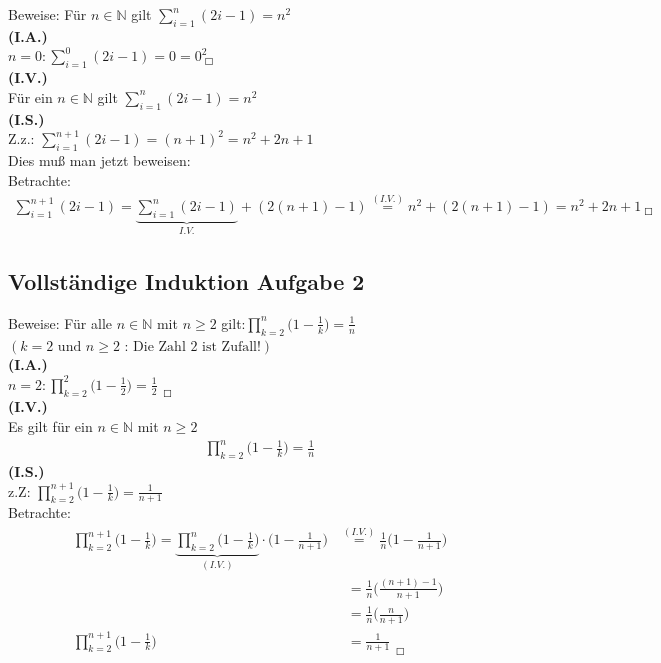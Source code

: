 Beweise: Für $ n\in\mathbb{N} $ gilt $ \sum\limits_{i=1}^{n}(2i-1)=n^2 $\\
\textbf{(I.A.)}\\
$ n=0:\sum\limits_{i=1}^{0}(2i-1)=0=0^2_{\;\Square} $\\
\textbf{(I.V.)}\\
Für ein $ n\in\mathbb{N} $ gilt $\sum\limits_{i=1}^{n}(2i-1)=n^2  $\\
\textbf{(I.S.)}\\
Z.z.: $ \sum\limits_{i=1}^{n+1}(2i-1) =(n+1)^2=n^2+2n+1$\\
Dies muß man jetzt beweisen:\\
Betrachte:\\
\begin{align*}
	\sum\limits_{i=1}^{n+1}(2i-1)=\underbrace {\sum\limits_{i=1}^{n}(2i-1)}_{I.V.}+(2(n+1)-1)\overset{(I.V.)}{=}n^2+(2(n+1)-1)=n^2+2n+1_{\;\Square}
\end{align*}
\subsection{Vollständige Induktion Aufgabe 2}

Beweise: Für alle $ n\in \mathbb{N}$ mit $ n \geq 2 $ gilt:$ \prod\limits_{k=2}^{n}\big(1-\frac{1}{k}\big)=\frac{1}{n} $\\
$ \scriptscriptstyle (k=2 \text{ und } n\geq2 \text{ : Die Zahl 2 ist Zufall!}) $\vspace*{2mm}\\
\textbf{(I.A.)}\\
$ n=2:\prod\limits_{k=2}^{2}\big(1-\frac{1}{2}\big)=\frac{1}{2}_{\;\;\Square} $\\
\textbf{(I.V.)}\\
Es gilt für ein $ n\in \mathbb{N} $ mit $ n\geq 2 $\\
\begin{align*}
	\prod\limits_{k=2}^{n}\bigg(1-\frac{1}{k}\bigg)=\frac{1}{n}
\end{align*}
\textbf{(I.S.)}\\
z.Z: $ \prod\limits_{k=2}^{n+1}\big(1-\frac{1}{k}\big)=\frac{1}{n+1} $\\
\newpage
\noindent
Betrachte:\\
\begin{align*}
	\prod\limits_{k=2}^{n+1}\bigg(1-\frac{1}{k}\bigg)=\underbrace {\prod\limits_{k=2}^{n}\bigg(1-\frac{1}{k}\bigg)}_{(I.V.)}\cdot\bigg(1-\frac{1}{n+1}\bigg) & \overset{(I.V.)}{=}\frac{1}{n}\bigg(1-\frac{1}{n+1}\bigg)\\
	&\;\;=\frac{1}{n} \bigg(\frac{(n+1)-1}{n+1}\bigg)\\
	&\;\;=\frac{1}{n}\bigg(\frac{n}{n+1}\bigg)\\
	\prod\limits_{k=2}^{n+1}\bigg(1-\frac{1}{k}\bigg)&\;\;=\frac{1}{n+1}_{\;\;\Square}\\
\end{align*}
